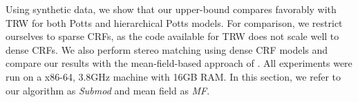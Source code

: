 \label{sec:exp}
Using synthetic data, we show that our upper-bound compares favorably with TRW
for both Potts and hierarchical Potts models. For comparison, we restrict
ourselves to sparse CRFs, as the code available for TRW does not scale well to
dense CRFs. We also perform stereo matching using dense CRF models and compare
our results with the mean-field-based approach of \citep{koltun2011efficient}.
All experiments were run on a x86-64, 3.8GHz machine with 16GB RAM. In this
section, we refer to our algorithm as \emph{Submod} and mean field as \emph{MF}. 

